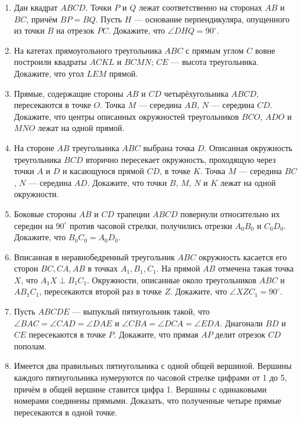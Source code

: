 \documentclass{article}
\begin{document}
	\begin{enumerate}[label*=\protect\fbox{\arabic{enumi}}]
		
		\item Дан квадрат $ABCD$. Точки $P$ и $Q$ лежат соответственно на сторонах $AB$ и $BC$, причём $BP =BQ$. Пусть $H$ — основание перпендикуляра, опущенного из точки $B$ на отрезок $PC$. Докажите, что $\angle DHQ = 90^\circ$.
		
		\item На катетах прямоугольного треугольника $ABC$ с прямым углом $C$ вовне построили квадраты $ACKL$ и $BCMN$; $CE$ — высота треугольника. Докажите, что угол $LEM$ прямой.
		
		\item Прямые, содержащие стороны $AB$ и $CD$ четырёхугольника $ABCD$, пересекаются в точке $O$. Точка $M$ — середина $AB$, $N$ — середина $CD$. Докажите, что центры описанных окружностей треугольников $BCO$, $ADO$ и $MNO$ лежат на одной прямой.
		
		\item На стороне $AB$ треугольника $ABC$ выбрана точка $D$. Описанная окружность треугольника $BCD$ вторично пересекает окружность, проходящую через точки $A$ и $D$ и касающуюся прямой $CD$, в точке $K$. Точка $M$ — середина $BC$, $N$ — середина $AD$. Докажите, что точки $B$, $M$, $N$ и $K$ лежат на одной окружности.
		
		\item Боковые стороны $AB$ и $CD$ трапеции $ABCD$ повернули относительно их середин на $90^\circ$ против часовой стрелки, получились отрезки $A_0B_0$ и $C_0D_0$. Докажите, что $B_0C_0=A_0D_0$.
		
		\item Вписанная в неравнобедренный треугольник $ABC$ окружность касается его сторон $BC, CA, AB$ в точках $A_1, B_1, C_1$. На прямой $AB$ отмечена такая точка $X$, что $A_1X\perp B_1C_1$. Окружности, описанные около треугольников $ABC$ и $AB_1C_1$, пересекаются второй раз в точке $Z$. Докажите, что $\angle XZC_1=90^\circ$.
		
		\item  Пусть $ABCDE$ — выпуклый пятиугольник такой, что
		$\angle BAC=\angle CAD=\angle DAE$ и $\angle CBA=\angle DCA=\angle EDA$.
		Диагонали $BD$ и $CE$ пересекаются в точке $P$. Докажите, что прямая $AP$ делит отрезок $CD$ пополам.
		
		\item Имеется два правильных пятиугольника с одной общей вершиной. Вершины каждого пятиугольника нумеруются по часовой стрелке цифрами от 1 до 5, причём в общей вершине ставится цифра 1. Вершины с одинаковыми номерами соединены прямыми. Доказать, что полученные четыре прямые пересекаются в одной точке.
		

\end{enumerate}
\end{document}
